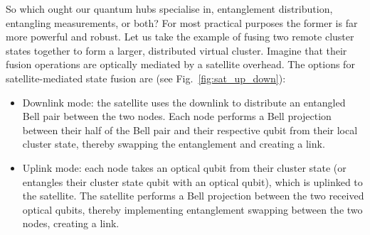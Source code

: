 So which ought our quantum hubs specialise in, entanglement distribution, entangling measurements, or both? For most practical purposes the former is far more powerful and robust. Let us take the example of fusing two remote cluster states together to form a larger, distributed virtual cluster. Imagine that their fusion operations are optically mediated by a satellite overhead. The options for satellite-mediated state fusion are (see Fig.~\ref{fig:sat_up_down}):
\begin{itemize}
	\item Downlink mode: the satellite uses the downlink to distribute an entangled Bell pair between the two nodes. Each node performs a Bell projection between their half of the Bell pair and their respective qubit from their local cluster state, thereby swapping the entanglement and creating a link.
	\item Uplink mode: each node takes an optical qubit from their cluster state (or entangles their cluster state qubit with an optical qubit), which is uplinked to the satellite. The satellite performs a Bell projection between the two received optical qubits, thereby implementing entanglement swapping between the two nodes, creating a link.
\end{itemize}

